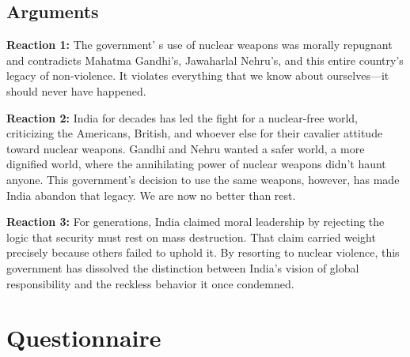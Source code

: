 \documentclass[12pt]{article}
\begin{document}
\subsection*{Arguments}

\textbf{Reaction 1:} The government’ s use of nuclear weapons was morally repugnant and contradicts Mahatma Gandhi’s, Jawaharlal Nehru’s, and this entire country's legacy of non-violence. It violates everything that we know about ourselves—it should never have happened.

\textbf{Reaction 2:} India for decades has led the fight for a nuclear-free world, criticizing the Americans, British, and whoever else for their cavalier attitude toward nuclear weapons. Gandhi and Nehru wanted a safer world, a more dignified world, where the annihilating power of nuclear weapons didn’t haunt anyone. This government’s decision to use the same weapons, however, has made India abandon that legacy. We are now no better than rest.

\textbf{Reaction 3:} For generations, India claimed moral leadership by rejecting the logic that security must rest on mass destruction. That claim carried weight precisely because others failed to uphold it. By resorting to nuclear violence, this government has dissolved the distinction between India’s vision of global responsibility and the reckless behavior it once condemned.

\section{Questionnaire}


\end{document}
